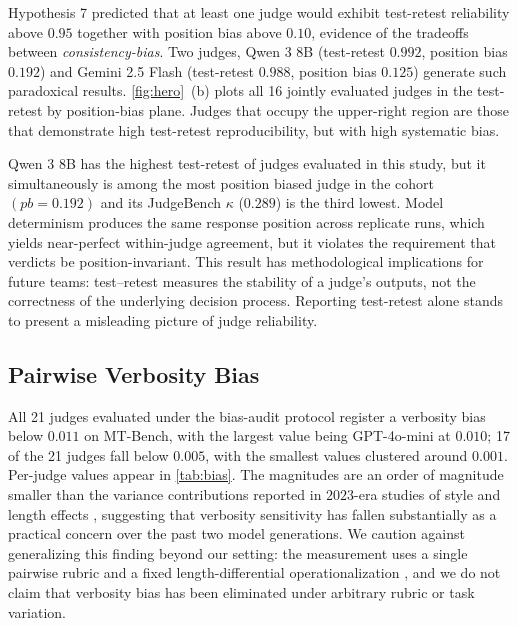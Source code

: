 \documentclass[11pt]{article}
\begin{document}
Hypothesis 7 predicted that at least one judge would exhibit test-retest reliability above $0.95$ together with position bias above $0.10$, evidence of the tradeoffs between \emph{consistency-bias}. Two judges, Qwen 3 8B (test-retest $0.992$, position bias $0.192$) and Gemini 2.5 Flash (test-retest $0.988$, position bias $0.125$) generate such paradoxical results. \autoref{fig:hero}~(b) plots all 16 jointly evaluated judges in the test-retest by position-bias plane. Judges that occupy the upper-right region are those that demonstrate high test-retest reproducibility, but with high systematic bias.

Qwen 3 8B has the highest test-retest of judges evaluated in this study, but it simultaneously is among the most position biased judge in the cohort $(pb=0.192)$ and its JudgeBench $\kappa$ ($0.289$) is the third lowest. Model determinism produces the same response position across replicate runs, which yields near-perfect within-judge agreement, but it violates the requirement that verdicts be position-invariant. This result has methodological implications for future teams: test--retest measures the stability of a judge's outputs, not the correctness of the underlying decision process. Reporting test-retest alone stands to present a misleading picture of judge reliability.

\subsection{Pairwise Verbosity Bias}


All 21 judges evaluated under the bias-audit protocol register a verbosity bias below $0.011$ on MT-Bench, with the largest value being GPT-4o-mini at $0.010$; 17 of the 21 judges fall below $0.005$, with the smallest values clustered around $0.001$. Per-judge values appear in \autoref{tab:bias}. The magnitudes are an order of magnitude smaller than the variance contributions reported in $2023$-era studies of style and length effects \citep{wu2023style}, suggesting that verbosity sensitivity has fallen substantially as a practical concern over the past two model generations. We caution against generalizing this finding beyond our setting: the measurement uses a single pairwise rubric and a fixed length-differential operationalization \citep{dubois2024alpacaeval}, and we do not claim that verbosity bias has been eliminated under arbitrary rubric or task variation.
\end{document}
